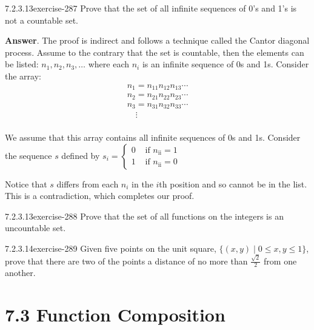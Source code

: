 \documentclass[twoside,10pt,]{book}
\numberwithin{equation}{section}
\begin{document}
\begin{divisionsolution}{7.2.3.13}{}{exercise-287}%
\hypertarget{p-2405}{}%
Prove that the set of all infinite sequences of 0's and 1's is not a countable set.%
\par\smallskip%
\noindent\textbf{Answer}.\quad%
\hypertarget{p-2406}{}%
The proof is indirect and follows a technique called the Cantor diagonal process. Assume to the contrary that the set is countable, then the elements can be listed: \(n_1,n_2,n_3,\ldots\) where each \(n_i\) is an infinite sequence of 0s and 1s. Consider the array:%
\begin{equation*}
\begin{array}{c}
n_1=n_{11}n_{12}n_{13}\cdots\\
n_2=n_{21}n_{22}n_{23}\cdots\\
n_3=n_{31}n_{32}n_{33}\cdots\\
\quad \vdots\\
\end{array}
\end{equation*}
%
\par
\hypertarget{p-2407}{}%
We assume that this array contains all infinite sequences of 0s and 1s. Consider the sequence \(s\) defined by \(s_i=\begin{cases}
0 & \textrm{ if } n_{\textrm{ii}}=1 \\
1 & \textrm{ if } n_{\textrm{ii}}=0
\end{cases}\)%
\par
\hypertarget{p-2408}{}%
Notice that \(s\) differs from each \(n_i\) in the \(i\)th position and so cannot be in the list. This is a contradiction, which completes our proof.%
\end{divisionsolution}%
\begin{divisionsolution}{7.2.3.13}{}{exercise-288}%
\hypertarget{p-2409}{}%
Prove that the set of all functions on the integers is an uncountable set.%
\end{divisionsolution}%
\begin{divisionsolution}{7.2.3.14}{}{exercise-289}%
\hypertarget{p-2410}{}%
Given five points on the unit square, \(\{(x,y) \mid 0 \leq x, y \leq 1 \}\), prove that there are two of the points a distance of no more than \(\frac{\sqrt{2}}{2}\) from one another.%
\end{divisionsolution}%
\section*{7.3 Function Composition}
\end{document}

